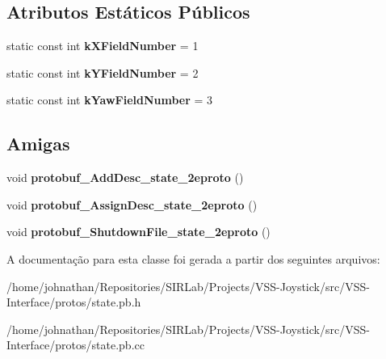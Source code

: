 \subsection*{Atributos Estáticos Públicos}
\begin{DoxyCompactItemize}
\item 
static const int {\bfseries k\+X\+Field\+Number} = 1\hypertarget{classvss__state_1_1Pose_a55da0ea3762949322b44da8206bb84f0}{}\label{classvss__state_1_1Pose_a55da0ea3762949322b44da8206bb84f0}

\item 
static const int {\bfseries k\+Y\+Field\+Number} = 2\hypertarget{classvss__state_1_1Pose_a0a2f401726b1453c65cbaa99fde61b4e}{}\label{classvss__state_1_1Pose_a0a2f401726b1453c65cbaa99fde61b4e}

\item 
static const int {\bfseries k\+Yaw\+Field\+Number} = 3\hypertarget{classvss__state_1_1Pose_a4f1b9b7cb0a470421a29a733329a7e7c}{}\label{classvss__state_1_1Pose_a4f1b9b7cb0a470421a29a733329a7e7c}

\end{DoxyCompactItemize}
\subsection*{Amigas}
\begin{DoxyCompactItemize}
\item 
void {\bfseries protobuf\+\_\+\+Add\+Desc\+\_\+state\+\_\+2eproto} ()\hypertarget{classvss__state_1_1Pose_aab1a2c258f8122a403a979ff57e2a706}{}\label{classvss__state_1_1Pose_aab1a2c258f8122a403a979ff57e2a706}

\item 
void {\bfseries protobuf\+\_\+\+Assign\+Desc\+\_\+state\+\_\+2eproto} ()\hypertarget{classvss__state_1_1Pose_a57d9367bc8a7a94ead11d11194cca1b6}{}\label{classvss__state_1_1Pose_a57d9367bc8a7a94ead11d11194cca1b6}

\item 
void {\bfseries protobuf\+\_\+\+Shutdown\+File\+\_\+state\+\_\+2eproto} ()\hypertarget{classvss__state_1_1Pose_a4e6dc5e8e72799859c4e9556d090e57d}{}\label{classvss__state_1_1Pose_a4e6dc5e8e72799859c4e9556d090e57d}

\end{DoxyCompactItemize}


A documentação para esta classe foi gerada a partir dos seguintes arquivos\+:\begin{DoxyCompactItemize}
\item 
/home/johnathan/\+Repositories/\+S\+I\+R\+Lab/\+Projects/\+V\+S\+S-\/\+Joystick/src/\+V\+S\+S-\/\+Interface/protos/state.\+pb.\+h\item 
/home/johnathan/\+Repositories/\+S\+I\+R\+Lab/\+Projects/\+V\+S\+S-\/\+Joystick/src/\+V\+S\+S-\/\+Interface/protos/state.\+pb.\+cc\end{DoxyCompactItemize}
